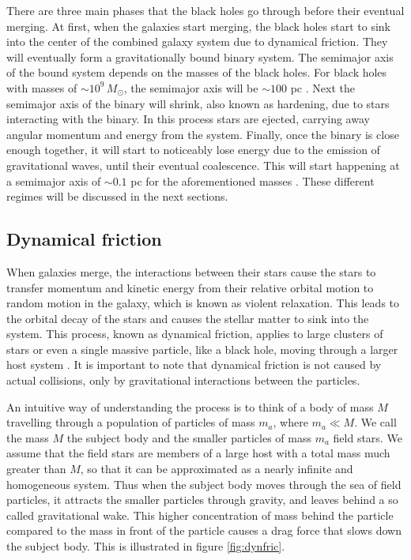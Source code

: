 \documentclass[english, oneside]{HYgradu}
\begin{document}
There are three main phases that the black holes go through before their eventual merging. At first, when the galaxies start merging, the black holes start to sink into the center of the combined galaxy system due to dynamical friction. They will eventually form a gravitationally bound binary system. The semimajor axis of the bound system depends on the masses of the black holes. For black holes with masses of $\sim 10^9 \, M_\odot$, the semimajor axis will be $\sim 100$ pc \citep{rantala:2018}. Next the semimajor axis of the binary will shrink, also known as hardening, due to stars interacting with the binary. In this process stars are ejected, carrying away angular momentum and energy from the system. Finally, once the binary is close enough together, it will start to noticeably lose energy due to the emission of gravitational waves, until their eventual coalescence. This will start happening at a semimajor axis of $\sim 0.1$ pc for the aforementioned masses \citep{rantala:2018}. These different regimes will be discussed in the next sections.

\subsection{Dynamical friction}

When galaxies merge, the interactions between their stars cause the stars to transfer momentum and kinetic energy from their relative orbital motion to random motion in the galaxy, which is known as violent relaxation. This leads to the orbital decay of the stars and causes the stellar matter to sink into the system. This process, known as dynamical friction, applies to large clusters of stars or even a single massive particle, like a black hole, moving through a larger host system \citep{bt-galdyn}. It is important to note that dynamical friction is not caused by actual collisions, only by gravitational interactions between the particles.

An intuitive way of understanding the process is to think of a body of mass $M$ travelling through a population of particles of mass $m_a$, where $m_a \ll M$. We call the mass $M$ the subject body and the smaller particles of mass $m_a$ field stars. We assume that the field stars are members of a large host with a total mass much greater than $M$, so that it can be approximated as a nearly infinite and homogeneous system. Thus when the subject body moves through the sea of field particles, it attracts the smaller particles through gravity, and leaves behind a so called gravitational wake. This higher concentration of mass behind the particle compared to the mass in front of the particle causes a drag force that slows down the subject body. This is illustrated in figure \ref{fig:dynfric}.
\end{document}
